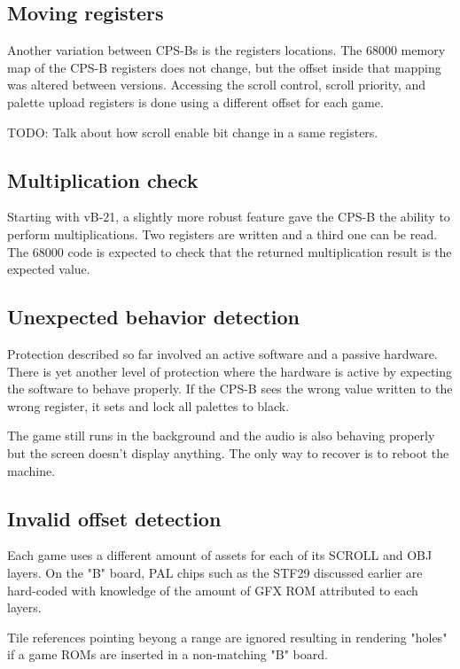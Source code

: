 \subsection{Moving registers}
Another variation between CPS-Bs is the registers locations. The 68000 memory map of the CPS-B registers does not change, but the offset inside that mapping was altered between versions. Accessing the scroll control, scroll priority, and palette upload registers is done using a different offset for each game.

TODO: Talk about how scroll enable bit change in a same registers.

\subsection{Multiplication check}
Starting with vB-21, a slightly more robust feature gave the CPS-B the ability to perform multiplications. Two registers are written and a third one can be read. The 68000 code is expected to check that the returned multiplication result is the expected value.


\subsection{Unexpected behavior detection}
Protection described so far involved an active software and a passive hardware. There is yet another level of protection where the hardware is active by expecting the software to behave properly. If the CPS-B sees the wrong value written to the wrong register, it sets and lock all palettes to black. 

The game still runs in the background and the audio is also behaving properly but the screen doesn't display anything. The only way to recover is to reboot the machine\cite{petitSecurity}.

\subsection{Invalid offset detection}

Each game uses a different amount of assets for each of its SCROLL and OBJ layers. On the "B" board, PAL chips such as the STF29 discussed earlier are hard-coded with knowledge of the amount of GFX ROM attributed to each layers.

Tile references pointing beyong a range are ignored resulting in rendering "holes" if a game ROMs are inserted in a non-matching "B" board.

